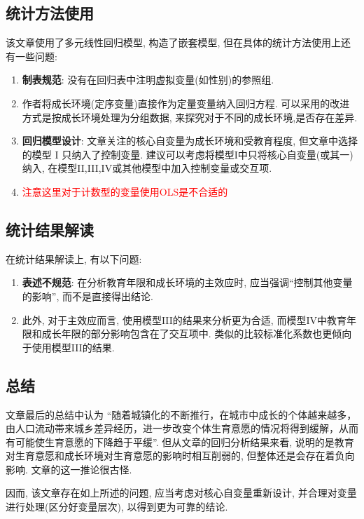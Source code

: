 \documentclass[11pt]{article}
\newcommand\1{\mathds{1}}
\begin{document}
\subsection{统计方法使用}
    该文章使用了多元线性回归模型, 构造了嵌套模型, 但在具体的统计方法使用上还有一些问题: 
    \begin{enumerate}[label=(\arabic*)]
        \item \textbf{制表规范}: 没有在回归表中注明虚拟变量(如性别)的参照组.
        \item 作者将成长环境(定序变量)直接作为定量变量纳入回归方程. 可以采用的改进方式是按成长环境处理为分组数据, 来探究对于不同的成长环境,是否存在差异.
        \item \textbf{回归模型设计}: 文章关注的核心自变量为成长环境和受教育程度, 但文章中选择的模型 I 只纳入了控制变量. 建议可以考虑将模型I中只将核心自变量(或其一)纳入, 在模型II,III,IV或其他模型中加入控制变量或交互项.
        \item \textcolor{red}{注意这里对于计数型的变量使用OLS是不合适的}
    \end{enumerate}
\subsection{统计结果解读}
    在统计结果解读上, 有以下问题:
    \begin{enumerate}[label=(\arabic*)]
        \item \textbf{表述不规范}: 在分析教育年限和成长环境的主效应时, 应当强调“控制其他变量的影响”, 而不是直接得出结论.
        \item 此外, 对于主效应而言, 使用模型III的结果来分析更为合适, 而模型IV中教育年限和成长年限的部分影响包含在了交互项中. 类似的比较标准化系数也更倾向于使用模型III的结果.
    \end{enumerate}
\subsection{总结}
    文章最后的总结中认为 “随着城镇化的不断推行，在城市中成长的个体越来越多，由人口流动帯来城乡差异经历，进一步改变个体生育意愿的情况将得到缓解，从而有可能使生育意愿的下降趋于平缓”. 
    但从文章的回归分析结果来看, 说明的是教育对生育意愿和成长环境对生育意愿的影响时相互削弱的, 但整体还是会存在着负向影响. 文章的这一推论很古怪. 

    因而, 该文章存在如上所述的问题, 应当考虑对核心自变量重新设计, 并合理对变量进行处理(区分好变量层次), 以得到更为可靠的结论.
\end{document}

